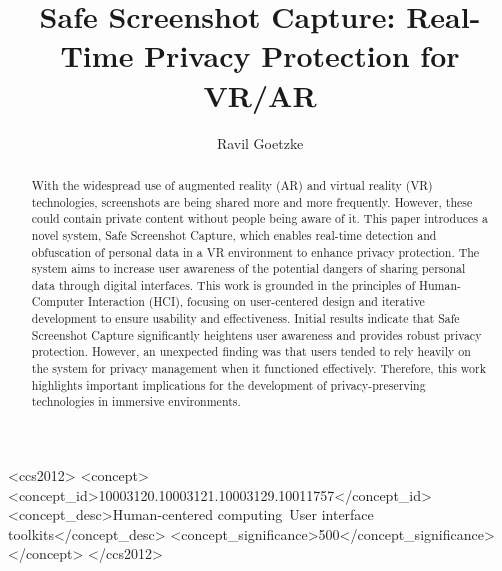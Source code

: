 \documentclass[sigconf,authordraft]{acmart}
\begin{document}
\title{Safe Screenshot Capture: Real-Time Privacy Protection for VR/AR}


\author{Ravil Goetzke}

\renewcommand{\shortauthors}{Goetzke}

\begin{abstract}
With the widespread use of augmented reality (AR) and virtual reality (VR) technologies, screenshots are being shared more and more frequently. However, these could contain private content without people being aware of it. This paper introduces a novel system, Safe Screenshot Capture, which enables real-time detection and obfuscation of personal data in a VR environment to enhance privacy protection. The system aims to increase user awareness of the potential dangers of sharing personal data through digital interfaces. This work is grounded in the principles of Human-Computer Interaction (HCI), focusing on user-centered design and iterative development to ensure usability and effectiveness. Initial results indicate that Safe Screenshot Capture significantly heightens user awareness and provides robust privacy protection. However, an unexpected finding was that users tended to rely heavily on the system for privacy management when it functioned effectively. Therefore, this work highlights important implications for the development of privacy-preserving technologies in immersive environments.

  
\end{abstract}

\begin{CCSXML}
<ccs2012>
<concept>
<concept_id>10003120.10003121.10003129.10011757</concept_id>
<concept_desc>Human-centered computing~User interface toolkits</concept_desc>
<concept_significance>500</concept_significance>
</concept>
</ccs2012>
\end{CCSXML}
\end{document}
